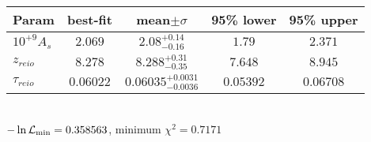 \begin{tabular}{|l|c|c|c|c|} 
 \hline 
Param & best-fit & mean$\pm\sigma$ & 95\% lower & 95\% upper \\ \hline 
$10^{+9}A_{s }$ &$2.069$ & $2.08_{-0.16}^{+0.14}$ & $1.79$ & $2.371$ \\ 
$z_{reio }$ &$8.278$ & $8.288_{-0.35}^{+0.31}$ & $7.648$ & $8.945$ \\ 
$\tau{}_{reio }$ &$0.06022$ & $0.06035_{-0.0036}^{+0.0031}$ & $0.05392$ & $0.06708$ \\ 
\hline 
 \end{tabular} \\ 
$-\ln{\cal L}_\mathrm{min} =0.358563$, minimum $\chi^2=0.7171$ \\ 
